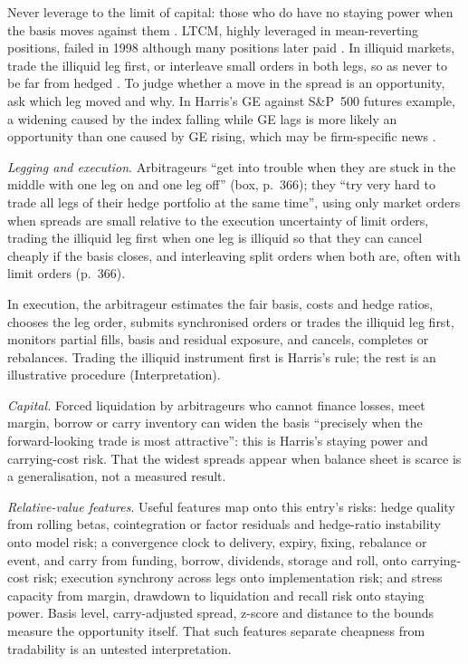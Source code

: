 \begin{qfresult}
 Never leverage to the limit of capital: those who do have no staying power when the basis moves against them \citep[same chap., secs.~17.4.2 and~17.4.4.2, pp.~368 and~372]{alpha-harris}. LTCM, highly leveraged in mean-reverting positions, failed in 1998 although many positions later paid \citep[same chap., box, p.~369]{alpha-harris}. In illiquid markets, trade the illiquid leg first, or interleave small orders in both legs, so as never to be far from hedged \citep[same chap., pp.~366--367]{alpha-harris}. To judge whether a move in the spread is an opportunity, ask which leg moved and why. In Harris's GE against S\&P~500 futures example, a widening caused by the index falling while GE lags is more likely an opportunity than one caused by GE rising, which may be firm-specific news \citep[same chap., box and Table~17-2, pp.~361--362]{alpha-harris}.

\emph{Legging and execution}. Arbitrageurs ``get into trouble when they are stuck in the middle with one leg on and one leg off'' (box, p.~366); they ``try very hard to trade all legs of their hedge portfolio at the same time'', using only market orders when spreads are small relative to the execution uncertainty of limit orders, trading the illiquid leg first when one leg is illiquid so that they can cancel cheaply if the basis closes, and interleaving split orders when both are, often with limit orders (p.~366).

In execution, the arbitrageur estimates the fair basis, costs and hedge ratios, chooses the leg order, submits synchronised orders or trades the illiquid leg first, monitors partial fills, basis and residual exposure, and cancels, completes or rebalances. Trading the illiquid instrument first is Harris's rule; the rest is an illustrative procedure (Interpretation).

\emph{Capital.} Forced liquidation by arbitrageurs who cannot finance losses, meet margin, borrow or carry inventory can widen the basis ``precisely when the forward-looking trade is most attractive'': this is Harris's staying power and carrying-cost risk. That the widest spreads appear when balance sheet is scarce is a generalisation, not a measured result.

\emph{Relative-value features}. Useful features map onto this entry's risks: hedge quality from rolling betas, cointegration or factor residuals and hedge-ratio instability onto model risk; a convergence clock to delivery, expiry, fixing, rebalance or event, and carry from funding, borrow, dividends, storage and roll, onto carrying-cost risk; execution synchrony across legs onto implementation risk; and stress capacity from margin, drawdown to liquidation and recall risk onto staying power. Basis level, carry-adjusted spread, z-score and distance to the bounds measure the opportunity itself. That such features separate cheapness from tradability is an untested interpretation.


\end{qfresult}
